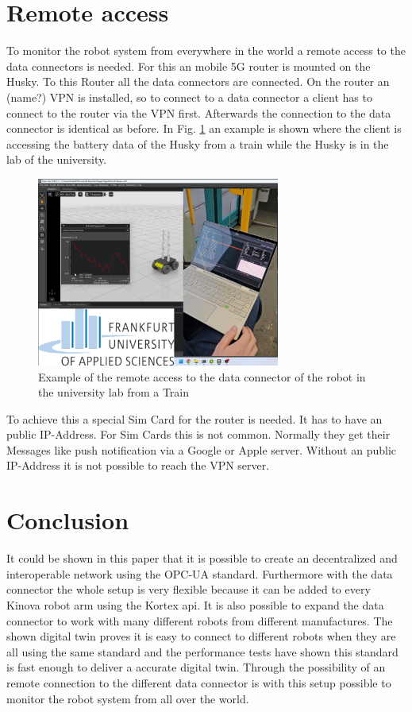 \documentclass[conference]{IEEEtran}
\begin{document}
\section{Remote access}
To monitor the robot system from everywhere in the world a remote access to the data connectors is needed.
For this an mobile 5G router is mounted on the Husky. To this Router all the data connectors are connected.
On the router an (name?) VPN is installed, so to connect to a data connector a client has to connect to the router via the VPN first.
Afterwards the connection to the data connector is identical as before.
In Fig. \ref{fig:RemoteAccess} an example is shown where the client is accessing the battery data of the Husky from a train while the Husky is in the lab of the university.
\begin{figure}[htbp]
    \centerline{\includegraphics[width=8cm]{Pictures/ZugZugriff.png}}
    \caption{Example of the remote access to the data connector of the robot in the university lab from a Train}
    \label{fig:RemoteAccess}
\end{figure}
To achieve this a special Sim Card for the router is needed.
It has to have an public IP-Address. For Sim Cards this is not common.
Normally they get their Messages like push notification via a Google or Apple server.
Without an public IP-Address it is not possible to reach the VPN server.
\section{Conclusion}
It could be shown in this paper that it is possible to create an decentralized and interoperable network using the OPC-UA standard.
Furthermore with the data connector the whole setup is very flexible because it can be added to every Kinova robot arm using the Kortex api.
It is also possible to expand the data connector to work with many different robots from different manufactures.
The shown digital twin proves it is easy to connect to different robots when they are all using the same standard and the performance tests have shown this standard is fast enough to deliver a accurate digital twin.
Through the possibility of an remote connection to the different data connector is with this setup possible to monitor the robot system from all over the world.
\end{document}
